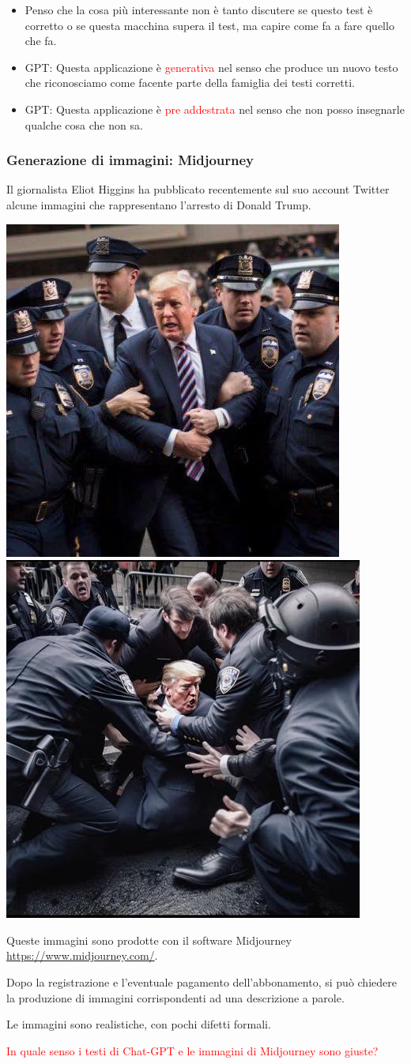 \documentclass[xcolor=svgnames]{beamer}
\newcommand{\rosso}[1]{\textcolor{red}{#1}}
\renewcommand{\emph}{\rosso}
\begin{document}
\begin{frame}
\begin{itemize}
\item Penso che la cosa più interessante non è tanto discutere se questo test è corretto o se questa macchina supera il test, ma capire come fa a fare quello che fa.

\item GPT: Questa applicazione è \emph{generativa} nel senso che produce un nuovo testo che riconosciamo come facente parte della famiglia dei testi corretti.
\item GPT: Questa applicazione è \emph{pre addestrata} nel senso che non posso insegnarle qualche cosa che non sa.

\end{itemize}

\end{frame}

\begin{frame}[plain]\small\frametitle{Generazione di immagini: Midjourney}
Il giornalista Eliot Higgins ha pubblicato recentemente sul suo account Twitter alcune immagini che rappresentano l'arresto di Donald Trump.

  \includegraphics[width=.4\textwidth]{pictures/trump-1.jpg}  \hfill 
   \includegraphics[width=.4\textwidth]{pictures/trump-2.jpg}  


    Queste immagini sono prodotte con il software Midjourney \url{https://www.midjourney.com/}. 
    
    Dopo la registrazione e l'eventuale pagamento dell'abbonamento, si può chiedere la produzione di immagini corrispondenti ad una descrizione a parole.

Le immagini sono realistiche, con pochi difetti formali.  

    \emph{In quale senso i testi di Chat-GPT  e le immagini di Midjourney sono giuste?}

\end{frame}
\end{document}
